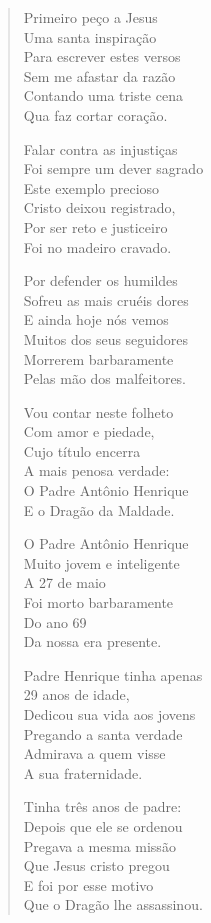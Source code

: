\begin{verse}
Primeiro peço a Jesus\\
Uma santa inspiração\\
Para escrever estes versos\\
Sem me afastar da razão\\
Contando uma triste cena\\
Qua faz cortar coração.

Falar contra as injustiças\\
Foi sempre um dever sagrado\\
Este exemplo precioso\\
Cristo deixou registrado,\\
Por ser reto e justiceiro\\
Foi no madeiro cravado.

Por defender os humildes\\
Sofreu as mais cruéis dores\\
E ainda hoje nós vemos\\
Muitos dos seus seguidores\\
Morrerem barbaramente\\
Pelas mão dos malfeitores.

Vou contar neste folheto\\
Com amor e piedade,\\
Cujo título encerra\\
A mais penosa verdade:\\
O Padre Antônio Henrique\\
E o Dragão da Maldade.

O Padre Antônio Henrique\\
Muito jovem e inteligente\\
A 27 de maio\\
Foi morto barbaramente\\
Do ano 69\\
Da nossa era presente.

Padre Henrique tinha apenas\\
29 anos de idade,\\
Dedicou sua vida aos jovens\\
Pregando a santa verdade\\
Admirava a quem visse\\
A sua fraternidade.

Tinha três anos de padre:\\
Depois que ele se ordenou\\
Pregava a mesma missão\\
Que Jesus cristo pregou\\
E foi por esse motivo\\
Que o Dragão lhe assassinou.


\end{verse}
